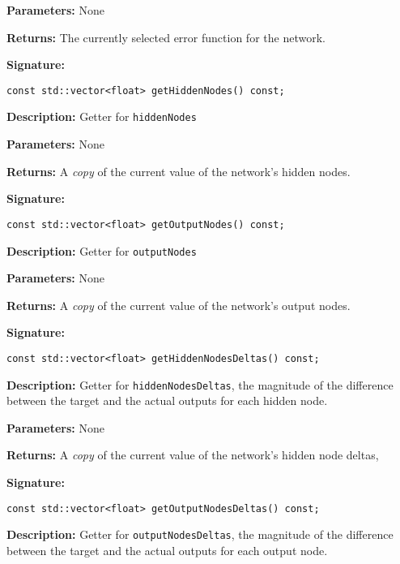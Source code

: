 \documentclass[a4paper]{article}
\begin{document}
\textbf{Parameters: } None

\textbf{Returns: }
The currently selected error function for the network.

\hrulefill %

\textbf{Signature:} \begin{lstlisting}
const std::vector<float> getHiddenNodes() const;
\end{lstlisting}

\textbf{Description: }
Getter for \lstinline{hiddenNodes}

\textbf{Parameters: } None

\textbf{Returns: }
A \textit{copy} of the current value of the network's hidden nodes.
\hrulefill %

\textbf{Signature:} \begin{lstlisting}
const std::vector<float> getOutputNodes() const;
\end{lstlisting}

\textbf{Description: }
Getter for \lstinline{outputNodes}

\textbf{Parameters: } None

\textbf{Returns: }
A \textit{copy} of the current value of the network's output nodes.

\hrulefill %

\textbf{Signature:} \begin{lstlisting}
const std::vector<float> getHiddenNodesDeltas() const;
\end{lstlisting}

\textbf{Description: }
Getter for \lstinline{hiddenNodesDeltas}, the magnitude of the difference between the target and the actual outputs for each hidden node.

\textbf{Parameters: } None

\textbf{Returns: }
A \textit{copy} of the current value of the network's hidden node deltas,

\hrulefill %

\textbf{Signature:} \begin{lstlisting}
const std::vector<float> getOutputNodesDeltas() const;
\end{lstlisting}

\textbf{Description: }
Getter for \lstinline{outputNodesDeltas}, the magnitude of the difference between the target and the actual outputs for each output node.
\end{document}
